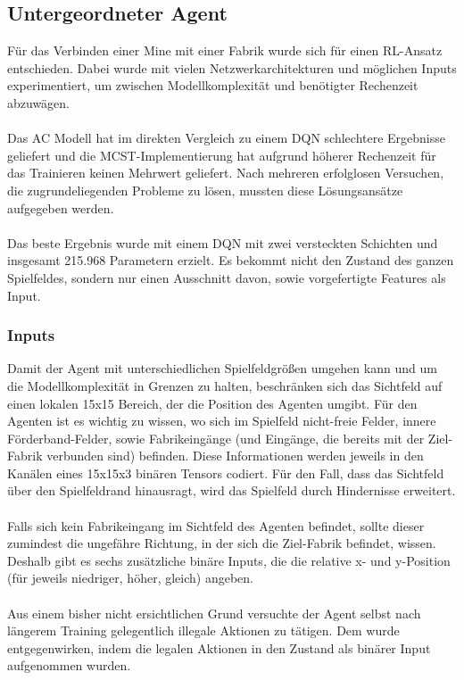 \subsection{Untergeordneter Agent}
Für das Verbinden einer Mine mit einer Fabrik wurde sich für einen RL-Ansatz entschieden. Dabei wurde mit vielen Netzwerkarchitekturen und möglichen Inputs experimentiert, um zwischen Modellkomplexität und benötigter Rechenzeit abzuwägen. 
\\\\
Das AC Modell hat im direkten Vergleich zu einem DQN schlechtere Ergebnisse geliefert und die MCST-Implementierung hat aufgrund höherer Rechenzeit für das Trainieren keinen Mehrwert geliefert. Nach mehreren erfolglosen Versuchen, die zugrundeliegenden Probleme zu lösen, mussten diese Lösungsansätze aufgegeben werden.
\\\\
Das beste Ergebnis wurde mit einem DQN mit zwei versteckten Schichten und insgesamt 215.968 Parametern erzielt. Es bekommt nicht den Zustand des ganzen Spielfeldes, sondern nur einen Ausschnitt davon, sowie vorgefertigte Features als Input.
\subsubsection{Inputs}
Damit der Agent mit unterschiedlichen Spielfeldgrößen umgehen kann und um die Modellkomplexität in Grenzen zu halten, beschränken sich das Sichtfeld auf einen lokalen 15x15 Bereich, der die Position des Agenten umgibt. 
Für den Agenten ist es wichtig zu wissen, wo sich im Spielfeld nicht-freie Felder, innere Förderband-Felder, sowie Fabrikeingänge (und Eingänge, die bereits mit der Ziel-Fabrik verbunden sind) befinden. Diese Informationen werden jeweils in den Kanälen eines  15x15x3 binären Tensors codiert. 
Für den Fall, dass das Sichtfeld über den Spielfeldrand hinausragt, wird das Spielfeld durch Hindernisse erweitert.
\\\\
Falls sich kein Fabrikeingang im Sichtfeld des Agenten befindet, sollte dieser zumindest die ungefähre Richtung, in der sich die Ziel-Fabrik befindet, wissen. Deshalb gibt es sechs zusätzliche binäre Inputs, die die relative x- und y-Position (für jeweils niedriger, höher, gleich) angeben.
\\\\
Aus einem bisher nicht ersichtlichen Grund versuchte der Agent selbst nach längerem Training gelegentlich illegale Aktionen zu tätigen. Dem wurde entgegenwirken, indem die legalen Aktionen in den Zustand als binärer Input aufgenommen wurden. 
